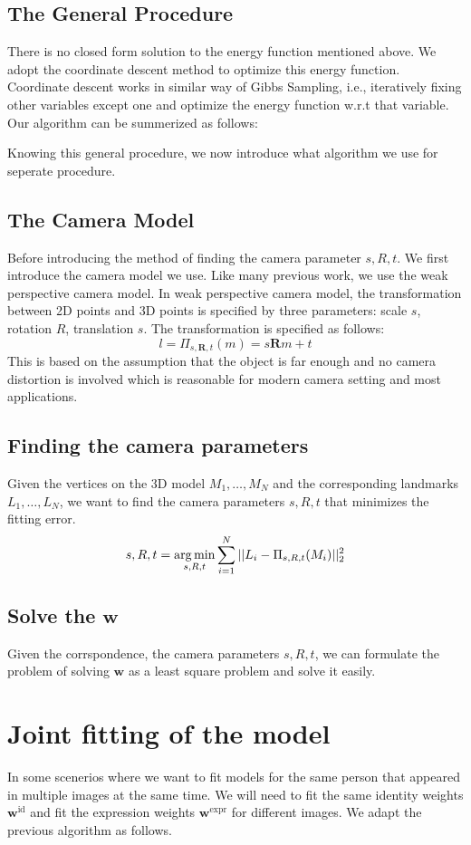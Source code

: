 \subsection{The General Procedure}
There is no closed form solution to the energy function mentioned above. We adopt the coordinate descent method to optimize this energy function. Coordinate descent works in similar way of Gibbs Sampling, i.e., iteratively fixing other variables except one and optimize the energy function w.r.t that variable. Our algorithm can be summerized as follows:



Knowing this general procedure, we now introduce what algorithm we use for seperate procedure.

\subsection{The Camera Model}
Before introducing the method of finding the camera parameter $s,R,t$. We first introduce the camera model we use. Like many previous work, we use the weak perspective camera model. In weak perspective camera model, the transformation between 2D points and 3D points is specified by three parameters: scale $s$, rotation $R$, translation $s$. The transformation is specified as follows:
$$l = \Pi_{s,\mathbf{R},t}(m) = s \mathbf{R} m + t$$
This is based on the assumption that the object is far enough and no camera distortion is involved which is reasonable for modern camera setting and most applications.
\subsection{Finding the camera parameters}
Given the vertices on the 3D model $M_1, \dots, M_N$ and the corresponding landmarks $L_1, \dots, L_N$, we want to find the camera parameters $s, R, t$ that minimizes the fitting error.
$$ s, R, t = \operatorname*{arg\,min}_{s,R,t} \sum_{i=1}^N|| L_i - \Pi_{s,R,t}(M_i)||_2^2$$

\subsection{Solve the $\mathbf{w}$}
Given the corrspondence, the camera parameters $s, R, t$, we can formulate the problem of solving $\mathbf{w}$ as a least square problem and solve it easily.


\section{Joint fitting of the model}
In some scenerios where we want to fit models for the same person that appeared in multiple images at the same time. We will need to fit the same identity weights $\mathbf{w}^{\text{id}}$ and fit the expression weights $\mathbf{w}^{\text{expr}}$ for different images. We adapt the previous algorithm as follows.

